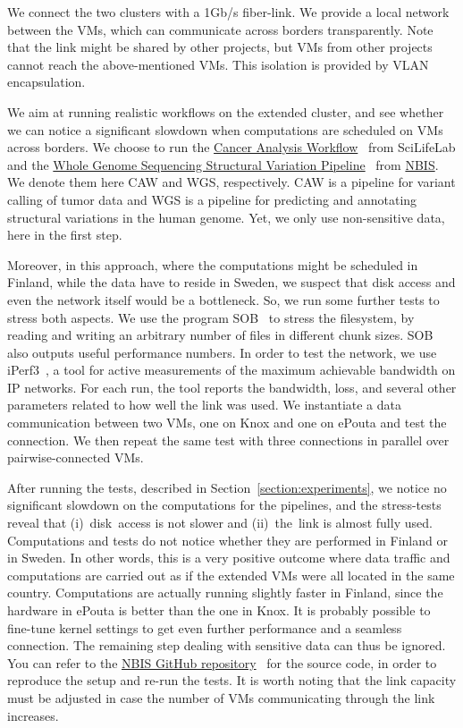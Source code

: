 We connect the two clusters with a 1Gb/s fiber-link. We provide a
local network between the VMs, which can communicate across borders
transparently.
%
Note that the link might be shared by other projects, but VMs from
other projects cannot reach the above-mentioned VMs.
%
This isolation is provided by VLAN encapsulation.


We aim at running realistic workflows on the extended cluster, and see
whether we can notice a significant slowdown when computations are
scheduled on VMs across borders.
%
We choose to run the \href{https://github.com/SciLifeLab/CAW}{Cancer
  Analysis Workflow}~\cite{caw} from SciLifeLab and the
\href{https://github.com/NBISweden/wgs-structvar}{Whole Genome
  Sequencing Structural Variation Pipeline}~\cite{caw} from
\href{http://www.nbis.se}{NBIS}.
%
We denote them here CAW and WGS, respectively.
%
CAW is a pipeline for variant calling of tumor data and WGS is a
pipeline for predicting and annotating structural variations in the
human genome.
%
Yet, we only use non-sensitive data, here in the first step.

Moreover, in this approach, where the computations might be scheduled
in Finland, while the data have to reside in Sweden, we suspect that
disk access and even the network itself would be a bottleneck. So, we
run some further tests to stress both aspects.
%
We use the program SOB~\cite{sob} to stress the filesystem, by reading
and writing an arbitrary number of files in different chunk sizes.
%
SOB also outputs useful performance numbers.
%
In order to test the network, we use iPerf3~\cite{iperf}, a tool for
active measurements of the maximum achievable bandwidth on IP
networks.
%
For each run, the tool reports the bandwidth, loss, and several other
parameters related to how well the link was used.
%
We instantiate a data communication between two VMs, one on Knox and
one on ePouta and test the connection.
%
We then repeat the same test with three connections in parallel over
pairwise-connected VMs.


After running the tests, described in
Section~\ref{section:experiments}, we notice no significant slowdown
on the computations for the pipelines, and the stress-tests reveal
that (i)~disk~access is not slower and (ii)~the~link is almost fully
used.
%
Computations and tests do not notice whether they are performed in
Finland or in Sweden.
%
In other words, this is a very positive outcome where data traffic and
computations are carried out as if the extended VMs were all located
in the same country.
%
Computations are actually running slightly faster in Finland, since
the hardware in ePouta is better than the one in Knox.
%
It is probably possible to fine-tune kernel settings
to get even further performance and a seamless connection.
%
The remaining step dealing with sensitive data can thus be ignored.
%
You can refer to the
\href{https://github.com/NBISweden/Knox-ePouta}{NBIS GitHub
  repository}~\cite{nbis-knox-epouta} for the source code, in order to
reproduce the setup and re-run the tests.
%
It is worth noting that the link capacity must be adjusted in case the
number of VMs communicating through the link increases.
